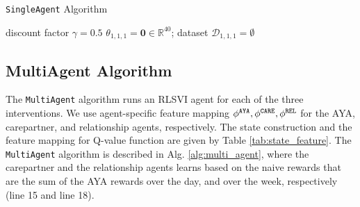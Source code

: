 \begin{algorithm}[hpt]
    \caption{\texttt{SingleAgent} Algorithm}
    \begin{algorithmic}[1]
         discount factor $\gamma = 0.5$
         $\theta_{1,1,1} = \mathbf{0} \in \mathbb{R}^{40}$; dataset $\mathcal{D}_{1,1,1} = \emptyset$
                    \ENDIF
                    \ENDIF
                \ENDFOR
            \ENDFOR
        \ENDFOR
    \end{algorithmic}
    \label{alg:single_agent}
\end{algorithm}

\subsection{MultiAgent Algorithm}

The \texttt{MultiAgent} algorithm runs an RLSVI agent for each of the three interventions. We use agent-specific feature mapping $\phi^{\tiny\texttt{AYA}}, \phi^{\tiny\texttt{CARE}}, \phi^{\tiny\texttt{REL}}$ for the AYA, carepartner, and relationship agents, respectively. The state construction and the feature mapping for Q-value function are given by Table \ref{tab:state_feature}. The \texttt{MultiAgent} algorithm is described in Alg. \ref{alg:multi_agent}, where the carepartner and the relationship agents learns based on the naive rewards that are the sum of the AYA rewards over the day, and over the week, respectively (line 15 and line 18).

